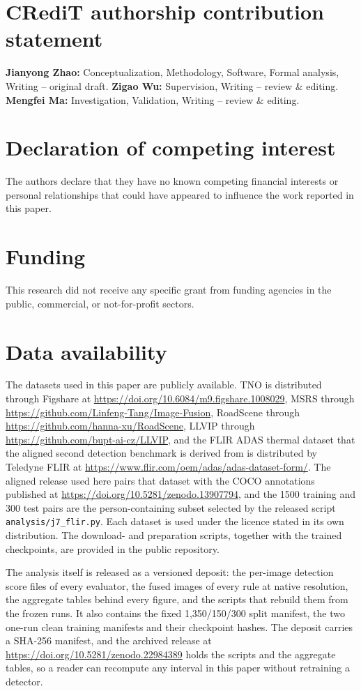 \documentclass[preprint,10pt]{elsarticle}
\begin{document}
\section*{CRediT authorship contribution statement}
\textbf{Jianyong Zhao:} Conceptualization, Methodology, Software, Formal analysis,
Writing -- original draft. \textbf{Zigao Wu:} Supervision, Writing -- review \&
editing. \textbf{Mengfei Ma:} Investigation, Validation, Writing -- review \&
editing.

\section*{Declaration of competing interest}
The authors declare that they have no known competing financial interests or
personal relationships that could have appeared to influence the work reported in
this paper.

\section*{Funding}
This research did not receive any specific grant from funding agencies in the
public, commercial, or not-for-profit sectors.

\section*{Data availability}
\begin{sloppypar}
The datasets used in this paper are publicly available. TNO is distributed through
Figshare at \url{https://doi.org/10.6084/m9.figshare.1008029}, MSRS through
\url{https://github.com/Linfeng-Tang/Image-Fusion}, RoadScene through
\url{https://github.com/hanna-xu/RoadScene}, LLVIP through
\url{https://github.com/bupt-ai-cz/LLVIP}, and the FLIR ADAS thermal dataset that the
aligned second detection benchmark is derived from is distributed by Teledyne FLIR at
\url{https://www.flir.com/oem/adas/adas-dataset-form/}. The aligned release used here
pairs that dataset with the COCO annotations published at
\url{https://doi.org/10.5281/zenodo.13907794}, and the 1500 training and 300 test pairs
are the person-containing subset selected by the released script
\texttt{analysis/j7\_flir.py}. Each dataset is used under the licence stated in its own
distribution. The
download- and preparation scripts, together with the trained checkpoints, are provided
in the public repository.
\end{sloppypar}

\begin{sloppypar}
The analysis itself is released as a versioned deposit: the per-image detection score
files of every evaluator, the fused images of every rule at native resolution, the
aggregate tables behind every figure, and the scripts that rebuild them from the frozen
runs. It also contains the fixed 1,350/150/300 split manifest, the two one-run clean
training manifests and their checkpoint hashes. The deposit carries a SHA-256 manifest, and the archived release at
\url{https://doi.org/10.5281/zenodo.22984389} holds the scripts and the aggregate tables,
so a reader can recompute any interval in this paper without retraining a detector.
\end{sloppypar}
\end{document}
